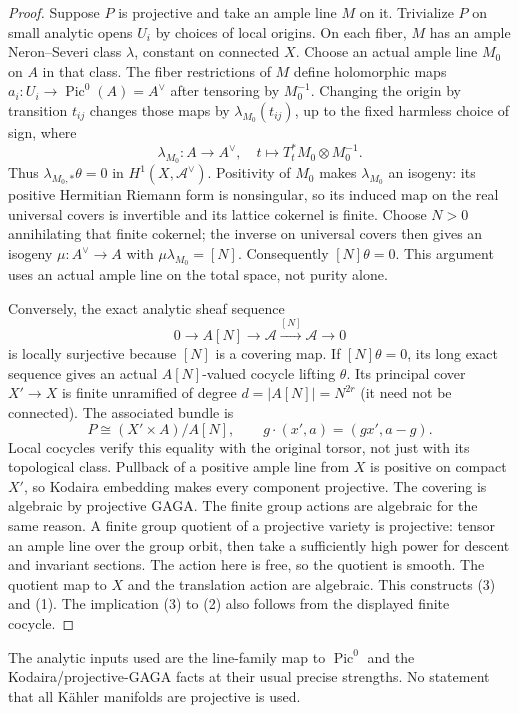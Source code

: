 \documentclass[11pt]{article}
\begin{document}
\begin{proof}
Suppose $P$ is projective and take an ample line $M$ on it. Trivialize $P$
on small analytic opens $U_i$ by choices of local origins. On each fiber,
$M$ has an ample Neron--Severi class $\lambda$, constant on connected $X$.
Choose an actual ample line $M_0$ on $A$ in that class. The fiber restrictions
of $M$ define holomorphic maps $a_i:U_i\to\operatorname{Pic}^0(A)=A^\vee$
after tensoring by $M_0^{-1}$. Changing the origin by transition $t_{ij}$
changes those maps by $\lambda_{M_0}(t_{ij})$, up to the fixed harmless
choice of sign, where
\[
 \lambda_{M_0}:A\to A^\vee,\quad
 t\mapsto T_t^*M_0\otimes M_0^{-1}.
\]
Thus $\lambda_{M_0,*}\theta=0$ in $H^1(X,\mathcal A^\vee)$.
Positivity of $M_0$ makes $\lambda_{M_0}$ an isogeny: its positive Hermitian
Riemann form is nonsingular, so its induced map on the real universal covers
is invertible and its lattice cokernel is finite. Choose $N>0$ annihilating
that finite cokernel; the inverse on universal covers then gives an isogeny
$\mu:A^\vee\to A$ with $\mu\lambda_{M_0}=[N]$. Consequently $[N]\theta=0$.
This argument uses an actual ample line on the total space, not purity alone.

Conversely, the exact analytic sheaf sequence
\[
 0\longrightarrow A[N]\longrightarrow\mathcal A
 \xrightarrow{[N]}\mathcal A\longrightarrow0
\]
is locally surjective because $[N]$ is a covering map. If $[N]\theta=0$,
its long exact sequence gives an actual $A[N]$-valued cocycle lifting
$\theta$. Its principal cover $X'\to X$ is finite unramified of degree
$d=|A[N]|=N^{2r}$ (it need not be connected). The associated bundle is
\[
 P\cong(X'\times A)/A[N],
 \qquad g\cdot(x',a)=(g x',a-g).
\]
Local cocycles verify this equality with the original torsor, not just
with its topological class. Pullback of a positive ample line from $X$
is positive on compact $X'$, so Kodaira embedding makes every component
projective. The covering is algebraic by projective GAGA. The finite group
actions are algebraic for the same reason. A finite group quotient of a
projective variety is projective: tensor an ample line over the group orbit,
then take a sufficiently high power for descent and invariant sections.
The action here is free, so the quotient is smooth. The quotient map to $X$
and the translation action are algebraic. This constructs (3) and (1).
The implication (3) to (2) also follows from the displayed finite cocycle.
\end{proof}
The analytic inputs used are the line-family map to $\operatorname{Pic}^0$
and the Kodaira/projective-GAGA facts at their usual precise strengths.
No statement that all K\"ahler manifolds are projective is used.
\end{document}
